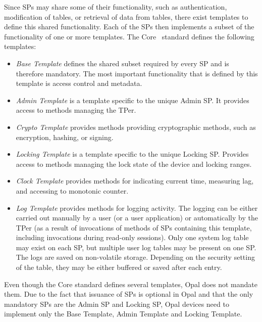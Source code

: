 Since SPs may share some of their functionality, such as authentication, modification of tables, or retrieval of data from tables, there exist templates to define this shared functionality. Each of the SPs then implements a subset of the functionality of one or more templates. %
The Core~\cite{tcg-storage-core} standard defines the following templates:
\begin{itemize}
\item \emph{Base Template} defines the shared subset required by every SP and is therefore mandatory. The most important functionality that is defined by this template is access control and metadata.
\item \emph{Admin Template} is a template specific to the unique Admin SP. It provides access to methods managing the TPer.
\item \emph{Crypto Template} provides methods providing cryptographic methods, such as encryption, hashing, or signing.
\item \emph{Locking Template} is a template specific to the unique Locking SP. Provides access to methods managing the lock state of the device and locking ranges.
\item \emph{Clock Template} provides methods for indicating current time, measuring lag, and accessing to monotonic counter. 
\item \emph{Log Template} provides methods for logging activity. The logging can be either carried out manually by a user (or a user application) or automatically by the TPer (as a result of invocations of methods of SPs containing this template, including invocations during read-only sessions). 
Only one system log table may exist on each SP, but multiple user log tables may be present on one SP.
The logs are saved on non-volatile storage. Depending on the security setting of the table, they may be either buffered or saved after each entry.

\end{itemize}

Even though the Core standard defines several templates, Opal does not mandate them. Due to the fact that issuance of SPs is optional in Opal and that the only mandatory SPs are the Admin SP and Locking SP, Opal devices need to implement only the Base Template, Admin Template and Locking Template.

